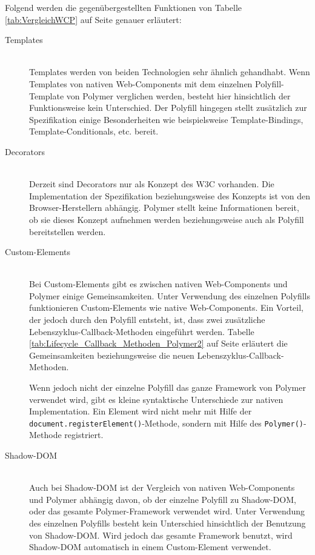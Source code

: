 Folgend werden die gegenübergestellten Funktionen von Tabelle \ref{tab:VergleichWCP} auf Seite \pageref{tab:VergleichWCP} genauer erläutert:
\begin{description}
\item[Templates] \hfill  \\
Templates werden von beiden Technologien sehr ähnlich gehandhabt. Wenn Templates von nativen Web-Components mit dem einzelnen Polyfill-Template von Polymer verglichen werden, besteht hier hinsichtlich der Funktionsweise kein Unterschied. Der Polyfill hingegen stellt zusätzlich zur Spezifikation einige Besonderheiten wie beispielsweise Template-Bindings, Template-Conditionals, etc. bereit.

\item[Decorators] \hfill \\
Derzeit sind Decorators nur als Konzept des W3C vorhanden. Die Implementation der Spezifikation beziehungsweise des Konzepts ist von den Browser-Herstellern abhängig. Polymer stellt keine Informationen bereit, ob sie dieses Konzept aufnehmen werden beziehungsweise auch als Polyfill bereitstellen werden.

\item[Custom-Elements] \hfill \\
Bei Custom-Elements gibt es zwischen nativen Web-Components und Polymer einige Gemeinsamkeiten. Unter Verwendung des einzelnen Polyfills funktionieren Custom-Elements wie native Web-Components. Ein Vorteil, der jedoch durch den Polyfill entsteht, ist, dass zwei zusätzliche Lebenszyklus-Callback-Methoden eingeführt werden. Tabelle \ref{tab:Lifecycle_Callback_Methoden_Polymer2} auf Seite \pageref{tab:Lifecycle_Callback_Methoden_Polymer2} erläutert die Gemeinsamkeiten beziehungsweise die neuen Lebenszyklus-Callback-Methoden.

Wenn jedoch nicht der einzelne Polyfill das ganze Framework von Polymer verwendet wird, gibt es kleine syntaktische Unterschiede zur nativen Implementation. Ein Element wird nicht mehr mit Hilfe der \lstinline|document.registerElement()|-Methode, sondern mit Hilfe des \lstinline|Polymer()|-Methode registriert.

\item[Shadow-DOM] \hfill \\
Auch bei Shadow-DOM ist der Vergleich von nativen Web-Components und Polymer abhängig davon, ob der einzelne Polyfill zu Shadow-DOM, oder das gesamte Polymer-Framework verwendet wird. Unter Verwendung des einzelnen Polyfills besteht kein Unterschied hinsichtlich der Benutzung von Shadow-DOM. Wird jedoch das gesamte Framework benutzt, wird Shadow-DOM automatisch in einem Custom-Element verwendet.


\end{description}
